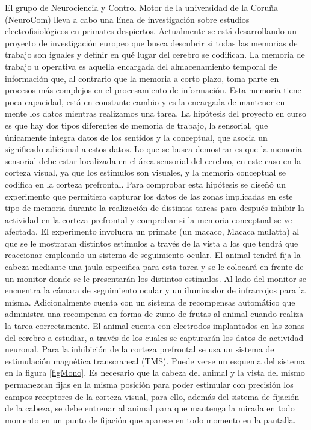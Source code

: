 \documentclass[conference]{IEEEtran}
\begin{document}
El grupo de Neurociencia y Control Motor de la universidad de la Coruña (NeuroCom) lleva a cabo una línea de investigación sobre estudios electrofisiológicos en primates despiertos\cite{neurocom1}\cite{neurocom2}. Actualmente se está desarrollando un proyecto de investigación europeo que busca descubrir si todas las memorias de trabajo son iguales y definir en qué lugar del cerebro se codifican. La memoria de trabajo u operativa es aquella encargada del almacenamiento temporal de información que, al contrario que la memoria a corto plazo, toma parte en procesos más complejos en el procesamiento de información. Esta memoria tiene poca capacidad, está en constante cambio y es la encargada de mantener en mente los datos mientras realizamos una tarea.
La hipótesis del proyecto en curso es que hay dos tipos diferentes de memoria de trabajo, la sensorial, que únicamente integra datos de los sentidos y la conceptual, que asocia un significado adicional a estos datos. Lo que se busca demostrar es que la memoria sensorial debe estar localizada en el área sensorial del cerebro, en este caso en la corteza visual, ya que los estímulos son visuales, y la memoria conceptual se codifica en la corteza prefrontal.
Para comprobar esta hipótesis se diseñó un experimento que permitiera capturar los datos de las zonas implicadas en este tipo de memoria durante la realización de distintas tareas para después inhibir la actividad en la corteza prefrontal y comprobar si la memoria conceptual se ve afectada.
El experimento involucra un primate (un macaco, Macaca mulatta) al que se le mostraran distintos estímulos a través de la vista a los que tendrá que reaccionar empleando un sistema de seguimiento ocular. El animal tendrá fija la cabeza mediante una jaula especifica para esta tarea y se le colocará en frente de un monitor donde se le presentarán los distintos estímulos. Al lado del monitor se encuentra la cámara de seguimiento ocular y un iluminador de infrarrojos para la misma. Adicionalmente cuenta con un sistema de recompensas automático que administra una recompensa en forma de zumo de frutas al animal cuando realiza la tarea correctamente. El animal cuenta con electrodos implantados en las zonas del cerebro a estudiar, a través de los cuales se capturarán los datos de actividad neuronal. Para la inhibición de la corteza prefrontal se usa un sistema de estimulación magnética transcraneal (TMS). Puede verse un esquema del sistema en la figura \ref{figMono}.
Es necesario que la cabeza del animal y la vista del mismo permanezcan fijas en la misma posición para poder estimular con precisión los campos receptores de la corteza visual, para ello, además del sistema de fijación de la cabeza, se debe entrenar al animal para que mantenga la mirada en todo momento en un punto de fijación que aparece en todo momento en la pantalla.
\end{document}
